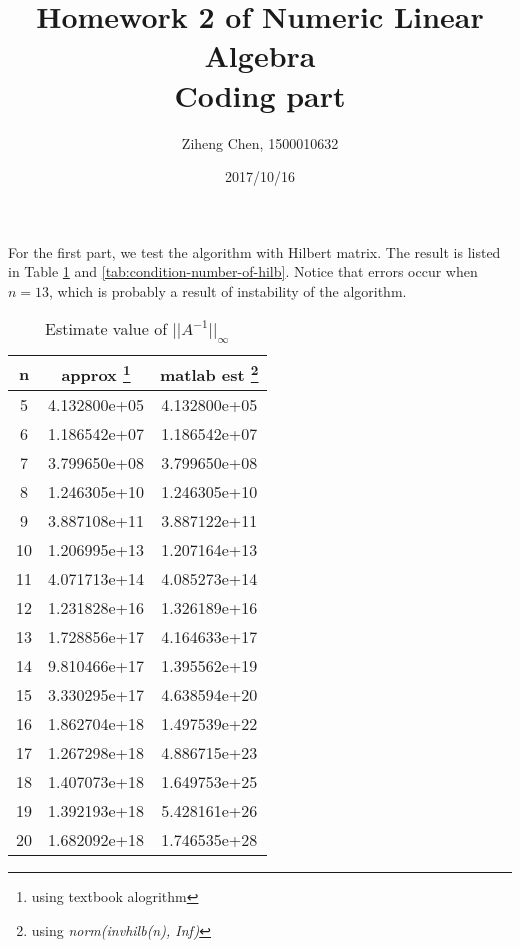 \documentclass[11pt]{article}
\begin{document}
\title{Homework 2 of Numeric Linear Algebra\\Coding part}
\date{2017/10/16}
\author{Ziheng Chen, 1500010632}
\maketitle
For the first part, we test the algorithm with Hilbert matrix.
The result is listed in Table \ref{tab:inf-norm-of-hilb} and \ref{tab:condition-number-of-hilb}.
Notice that errors occur when $n=13$, which is probably a result of instability of the algorithm.
\begin{table}[htpb]
\centering
\begin{tabular}{ccc}
	\hline
	n  & approx \footnote{using textbook alogrithm} & matlab est \footnote{using \em{norm(invhilb(n), Inf)}}   \\
	\hline
	5  & 4.132800e+05 & 4.132800e+05 \\
	6  & 1.186542e+07 & 1.186542e+07 \\
	7  & 3.799650e+08 & 3.799650e+08 \\
	8  & 1.246305e+10 & 1.246305e+10 \\
	9  & 3.887108e+11 & 3.887122e+11 \\
	10 & 1.206995e+13 & 1.207164e+13 \\
	11 & 4.071713e+14 & 4.085273e+14 \\
	12 & 1.231828e+16 & 1.326189e+16 \\
	13 & 1.728856e+17 & 4.164633e+17 \\
	14 & 9.810466e+17 & 1.395562e+19 \\
	15 & 3.330295e+17 & 4.638594e+20 \\
	16 & 1.862704e+18 & 1.497539e+22 \\
	17 & 1.267298e+18 & 4.886715e+23 \\
	18 & 1.407073e+18 & 1.649753e+25 \\
	19 & 1.392193e+18 & 5.428161e+26 \\
	20 & 1.682092e+18 & 1.746535e+28 \\
	\hline
\end{tabular}
\caption{Estimate value of $||A^{-1}||_{\infty}$}
\label{tab:inf-norm-of-hilb}
\end{table}
\end{document}
